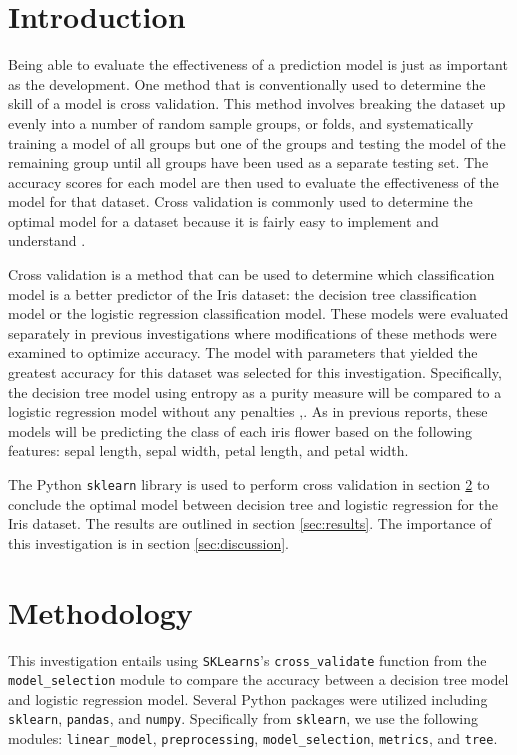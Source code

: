 \documentclass[journal]{IEEEtran}
\begin{document}
\section{Introduction}
\label{sec:introduction}
Being able to evaluate the effectiveness of a prediction model is just as important as the development. One method that is conventionally used to determine the skill of a model is cross validation. This method involves breaking the dataset up evenly into a number of random sample groups, or folds, and systematically training a model of all groups but one of the groups and testing the model of the remaining group until all groups have been used as a separate testing set. The accuracy scores for each model are then used to evaluate the effectiveness of the model for that dataset. Cross validation is commonly used to determine the optimal model for a dataset because it is fairly easy to implement and understand \cite{b1}. 

Cross validation is a method that can be used to determine which classification model is a better predictor of the Iris dataset: the decision tree classification model or the logistic regression classification model. These models were evaluated separately in previous investigations where modifications of these methods were examined to optimize accuracy. The model with parameters that yielded the greatest accuracy for this dataset was selected for this investigation. Specifically, the decision tree model using entropy as a purity measure will be compared to a logistic regression model without any penalties \cite{b2},\cite{b3}. As in previous reports, these models will be predicting the class of each iris flower based on the following features: sepal length, sepal width, petal length, and petal width.

The Python \lstinline{sklearn} library is used to perform cross validation in section \ref{sec:methodology} to conclude the optimal model between decision tree and logistic regression for the Iris dataset. The results are outlined in section \ref{sec:results}. The importance of this investigation is in section \ref{sec:discussion}. 

\vspace{40px}

\section{Methodology}
\label{sec:methodology}

This investigation entails using \lstinline{SKLearns}'s \lstinline{cross_validate} function from the \lstinline{model_selection} module to compare the accuracy between a decision tree model and logistic regression model. Several Python packages were utilized including \lstinline{sklearn}, \lstinline{pandas}, and \lstinline{numpy}. Specifically from \lstinline{sklearn}, we use the following modules: \lstinline{linear_model}, \lstinline{preprocessing}, \lstinline{model_selection}, \lstinline{metrics}, and \lstinline{tree}. 
\end{document}
